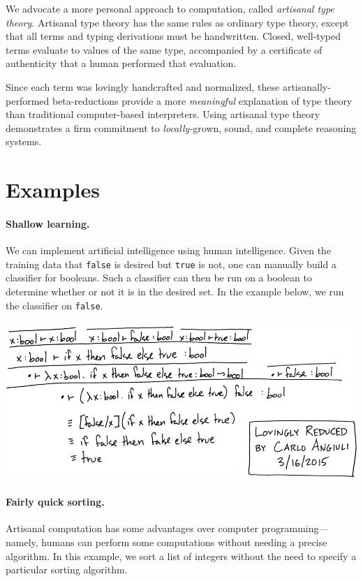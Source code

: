 \documentclass[10pt]{article}
\begin{document}
We advocate a more personal approach to computation, called \emph{artisanal type
theory}. Artisanal type theory has the same rules as ordinary type theory,
except that all terms and typing derivations must be handwritten. Closed,
well-typed terms evaluate to values of the same type, accompanied by a
certificate of authenticity that a human performed that evaluation.

Since each term was lovingly handcrafted and normalized, these
artisanally-performed beta-reductions provide a more \emph{meaningful}
explanation of type theory than traditional computer-based interpreters.
Using artisanal type theory demonstrates a firm commitment to
\emph{locally-}grown, sound, and complete reasoning systems.

\section{Examples}

\paragraph{Shallow learning.}
We can implement artificial intelligence using human intelligence. Given the
training data that \texttt{false} is desired but \texttt{true} is not, one can
manually build a classifier for booleans. Such a classifier can then be run on a
boolean to determine whether or not it is in the desired set. In the example
below, we run the classifier on \texttt{false}.

\vspace{1em}\noindent
\includegraphics[width=\textwidth]{isfalse.png}

\paragraph{Fairly quick sorting.}
Artisanal computation has some advantages over computer programming---namely,
humans can perform some computations without needing a precise algorithm.
In this example, we sort a list of integers without the need to specify a
particular sorting algorithm.
\end{document}
